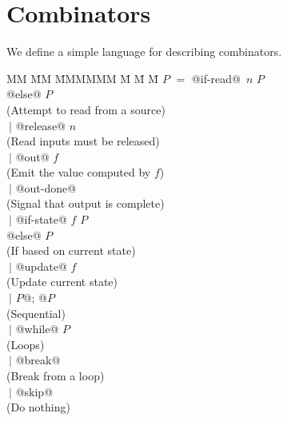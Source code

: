 \section{Combinators}
\label{s:Combinators}

We define a simple language for describing combinators.

\begin{tabbing}
MM \= MM \= MMMMMM \= M \= M \= M\kill
$P$      \> $=$ \> @if-read@~$n$  \> $P$            \\
         \>     \> @else@         \> $P$            \\
         \>     \> (Attempt to read from a source) \\

         \> $~|$\> @release@  \> \> $n$         \\
         \>     \> (Read inputs must be released) \\

         \> $~|$\> @out@      \> $f$                \\
         \>     \> (Emit the value computed by $f$) \\

         \> $~|$\> @out-done@  \>                \\
         \>     \> (Signal that output is complete) \\

         \> $~|$\> @if-state@  \> $f$ \> $P$        \\
         \>     \> @else@      \>     \> $P$        \\
         \>     \> (If based on current state) \\

         \> $~|$\> @update@   \> $f$ \\
         \>     \> (Update current state) \\

         \> $~|$\> $P$@; @$P$                                  \\
         \>     \> (Sequential) \\

         \> $~|$\> @while@  \> $P$  \\
         \>     \> (Loops) \\

         \> $~|$\> @break@  \\
         \>     \> (Break from a loop) \\

         \> $~|$\> @skip@  \\
         \>     \> (Do nothing) \\
\end{tabbing}

